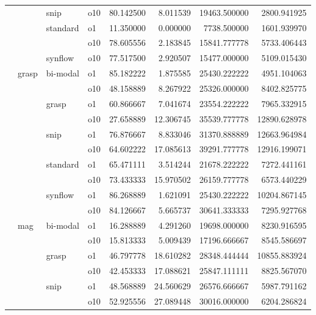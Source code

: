 \begin{longtable}{llllrrrr}
      &     & snip & o10 &  80.142500 &   8.011539 &     19463.500000 &   2800.941925 \\
      &     & standard & o1 &  11.350000 &   0.000000 &      7738.500000 &   1601.939970 \\
      &     &         & o10 &  78.605556 &   2.183845 &     15841.777778 &   5733.406443 \\
      &     & synflow & o10 &  77.517500 &   2.920507 &     15477.000000 &   5109.015430 \\
      & grasp & bi-modal & o1 &  85.182222 &   1.875585 &     25430.222222 &   4951.104063 \\
      &     &         & o10 &  48.158889 &   8.267922 &     25326.000000 &   8402.825775 \\
      &     & grasp & o1 &  60.866667 &   7.041674 &     23554.222222 &   7965.332915 \\
      &     &         & o10 &  27.658889 &  12.306745 &     35539.777778 &  12890.628978 \\
      &     & snip & o1 &  76.876667 &   8.833046 &     31370.888889 &  12663.964984 \\
      &     &         & o10 &  64.602222 &  17.085613 &     39291.777778 &  12916.199071 \\
      &     & standard & o1 &  65.471111 &   3.514244 &     21678.222222 &   7272.441161 \\
      &     &         & o10 &  73.433333 &  15.970502 &     26159.777778 &   6573.440229 \\
      &     & synflow & o1 &  86.268889 &   1.621091 &     25430.222222 &  10204.867145 \\
      &     &         & o10 &  84.126667 &   5.665737 &     30641.333333 &   7295.927768 \\
      & mag & bi-modal & o1 &  16.288889 &   4.291260 &     19698.000000 &   8230.916595 \\
      &     &         & o10 &  15.813333 &   5.009439 &     17196.666667 &   8545.586697 \\
      &     & grasp & o1 &  46.797778 &  18.610282 &     28348.444444 &  10855.883924 \\
      &     &         & o10 &  42.453333 &  17.088621 &     25847.111111 &   8825.567070 \\
      &     & snip & o1 &  48.568889 &  24.560629 &     26576.666667 &   5987.791162 \\
      &     &         & o10 &  52.925556 &  27.089448 &     30016.000000 &   6204.286824 \\

\end{longtable}
